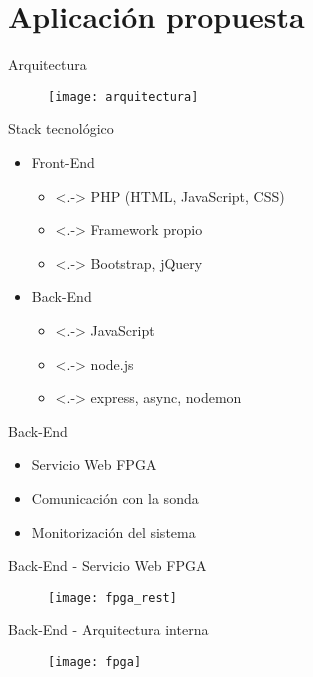 \section{Aplicación propuesta}

\begin{frame}{Arquitectura}
  \begin{figure}
    \texttt{[image: arquitectura]}
  \end{figure}
\end{frame}

\begin{frame}{Stack tecnológico}
 \begin{itemize}[<+->]
    \item \alert{Front-End}
    \begin{itemize}
      \item<.-> PHP (HTML, JavaScript, CSS)
      \item<.-> Framework propio
      \item<.-> Bootstrap, jQuery
    \end{itemize}
    \item \alert{Back-End}
    \begin{itemize}
      \item<.-> JavaScript
      \item<.-> node.js
      \item<.-> express, async, nodemon
    \end{itemize}
  \end{itemize}
\end{frame}

\begin{frame}{Back-End}
 \begin{itemize}[<alert@+>]
    \item Servicio Web FPGA
    \item Comunicación con la sonda
    \item Monitorización del sistema
  \end{itemize}
\end{frame}

\begin{frame}{Back-End - Servicio Web FPGA}
  \begin{figure}
    \texttt{[image: fpga\_rest]}
  \end{figure}
\end{frame}

\begin{frame}{Back-End - Arquitectura interna}
  \begin{figure}
    \texttt{[image: fpga]}
  \end{figure}
\end{frame}

